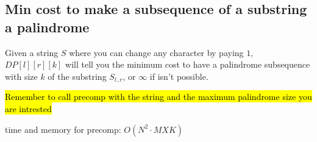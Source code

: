 \subsection{Min cost to make a subsequence of a substring a palindrome}

Given a string $S$ where you can change any character by paying $1$, $DP[l][r][k]$ will tell you the minimum cost to have a palindrome subsequence with size $k$ of the substring $S_{l..r}$, or $\infty$ if isn't possible.

\hl{Remember to call precomp with the string and the maximum palindrome size you are intrested}

time and memory for precomp: $O(N^2 \cdot MXK)$

